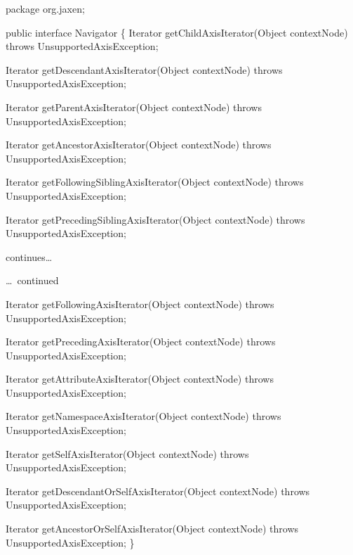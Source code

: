 \documentclass[20pt,landscape,headrule,footrule]{foils}
\begin{document}



\begin{codelisting}
package org.jaxen;

public interface Navigator
\{
    Iterator getChildAxisIterator(Object contextNode)
        throws UnsupportedAxisException;

    Iterator getDescendantAxisIterator(Object contextNode)
        throws UnsupportedAxisException;

    Iterator getParentAxisIterator(Object contextNode)
        throws UnsupportedAxisException;

    Iterator getAncestorAxisIterator(Object contextNode)
        throws UnsupportedAxisException;

    Iterator getFollowingSiblingAxisIterator(Object contextNode)
        throws UnsupportedAxisException;

    Iterator getPrecedingSiblingAxisIterator(Object contextNode)
        throws UnsupportedAxisException;
\end{codelisting}

continues\dots


\dots\ continued

\begin{codelisting}
    Iterator getFollowingAxisIterator(Object contextNode)
        throws UnsupportedAxisException;

    Iterator getPrecedingAxisIterator(Object contextNode)
        throws UnsupportedAxisException;

    Iterator getAttributeAxisIterator(Object contextNode)
        throws UnsupportedAxisException;

    Iterator getNamespaceAxisIterator(Object contextNode)
        throws UnsupportedAxisException;

    Iterator getSelfAxisIterator(Object contextNode)
        throws UnsupportedAxisException;

    Iterator getDescendantOrSelfAxisIterator(Object contextNode)
        throws UnsupportedAxisException;

    Iterator getAncestorOrSelfAxisIterator(Object contextNode)
        throws UnsupportedAxisException;
\}
\end{codelisting}
\end{document}
